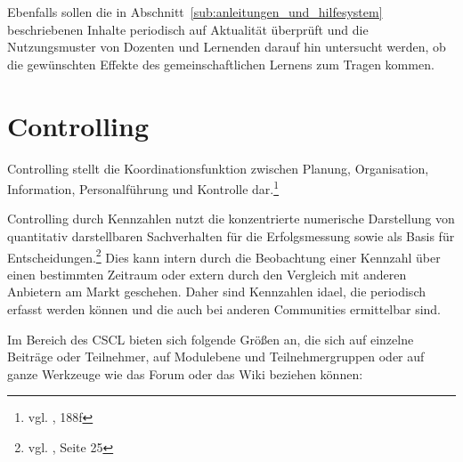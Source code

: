 Ebenfalls sollen die in Abschnitt~\ref{sub:anleitungen_und_hilfesystem} beschriebenen Inhalte periodisch auf Aktualität überprüft und die Nutzungsmuster von Dozenten und Lernenden darauf hin untersucht werden, ob die gewünschten Effekte des gemeinschaftlichen Lernens zum Tragen kommen.

\section{Controlling} %
\label{sec:controlling}

Controlling stellt die Koordinationsfunktion zwischen Planung, Organisation, Information, Personalführung und Kontrolle dar.\footnote{vgl. \cite{woehe}, 188f}

Controlling durch Kennzahlen nutzt die konzentrierte numerische Darstellung von quantitativ darstellbaren Sachverhalten für die Erfolgsmessung sowie als Basis für Entscheidungen.\footnote{vgl. \cite{reichmann}, Seite 25} Dies kann intern durch die Beobachtung einer Kennzahl über einen bestimmten Zeitraum oder extern durch den Vergleich mit anderen Anbietern am Markt geschehen. Daher sind Kennzahlen idael, die periodisch erfasst werden können und die auch bei anderen Communities ermittelbar sind.

Im Bereich des \ac{CSCL} bieten sich folgende Größen an, die sich auf einzelne Beiträge oder Teilnehmer, auf Modulebene und Teilnehmergruppen oder auf ganze Werkzeuge wie das Forum oder das Wiki beziehen können:

